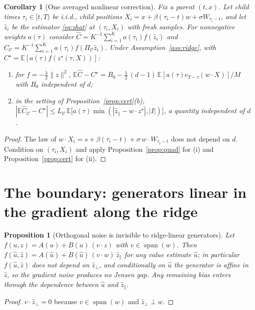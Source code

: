 \documentclass[11pt]{article}
\newtheorem{proposition}[lemma]{Proposition}
\newtheorem{corollary}[lemma]{Corollary}
\theoremstyle{remark}
\theoremstyle{definition}
\newcommand{\E}{\mathbb E}
\newcommand{\norm}[1]{\lVert #1\rVert}
\newcommand{\zh}{\widehat z}
\newcommand{\zpar}{\widehat z_{\parallel}}
\newcommand{\zperp}{\widehat z_{\perp}}
\newcommand{\Proj}{\Pi}
\begin{document}
\begin{corollary}[One averaged nonlinear correction]\label{cor:onelevel}
Fix a parent $(t,x)$. Let child times $\tau_i\in[t,T)$ be i.i.d., child positions
$X_i=x+\beta(\tau_i-t)w+\sigma W_{\tau_i-t}$, and let $\zh_i$ be the estimator
\eqref{eq:zhat} at $(\tau_i,X_i)$ with fresh samples. For nonnegative weights $a(\tau)$
consider $\widehat C=K^{-1}\sum_{i=1}^K a(\tau_i)f(\zh_i)$ and
$\widehat C_{\mathcal C}=K^{-1}\sum_{i=1}^K a(\tau_i)f(\Proj_{\mathcal C}\zh_i)$.
Under Assumption~\ref{ass:ridge}, with $C^\star=\E[a(\tau)f(z^\star(\tau,X))]$:
\begin{enumerate}
\item[(i)] for $f=-\tfrac\lambda2\norm z^2$,
$\E\widehat C-C^\star=B_0-\tfrac\lambda2\,(d-1)\,\E[a(\tau)c_{T-\tau}(w\cdot X)]/M$
with $B_0$ independent of $d$;
\item[(ii)] in the setting of Proposition~\ref{prop:cert}(b),
$|\E\widehat C_{\mathcal C}-C^\star|\le L_{\mathcal C}\,
\E\bigl[a(\tau)\min(|\zpar-w\cdot z^\star|,|I|)\bigr]$, a quantity independent of $d$.
\end{enumerate}
\end{corollary}

\begin{proof}
The law of $w\cdot X_i=s+\beta(\tau_i-t)+\sigma\,w\cdot W_{\tau_i-t}$ does not depend on
$d$. Condition on $(\tau_i,X_i)$ and apply Proposition~\ref{prop:quad} for (i) and
Proposition~\ref{prop:cert} for (ii).
\end{proof}

\section{The boundary: generators linear in the gradient along the ridge}

\begin{proposition}[Orthogonal noise is invisible to ridge-linear generators]\label{prop:linear}
Let $f(u,z)=A(u)+B(u)\,(v\cdot z)$ with $v\in\operatorname{span}(w)$. Then
$f(\widehat u,\zh)=A(\widehat u)+B(\widehat u)\,(v\cdot w)\,\zpar$ for any value
estimate $\widehat u$; in particular $f(\widehat u,\zh)$ does not depend on $\zperp$, and
conditionally on $\widehat u$ the generator is affine in $\zh$, so the gradient noise
produces no Jensen gap. Any remaining bias enters through the dependence between
$\widehat u$ and $\zpar$.
\end{proposition}

\begin{proof}
$v\cdot\zperp=0$ because $v\in\operatorname{span}(w)$ and $\zperp\perp w$.
\end{proof}
\end{document}
